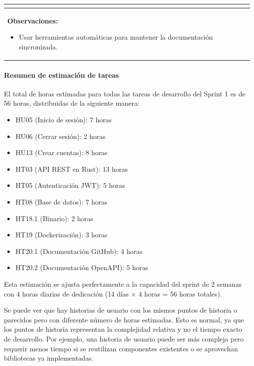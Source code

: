 \begin{table}[H]
\begin{center}
\begin{tabularx}{\textwidth}{|l|X|l|}
{\begin{itemize}
                    \end{itemize}
            }\\
            \hline
            \multicolumn{3}{|p{\textwidth}|}{
                \textbf{Observaciones:}
                \begin{itemize}
                    \item Usar herramientas automáticas para mantener la documentación sincronizada.
                \end{itemize}
            }\\
            \hline
        \end{tabularx}
    \end{center}
\end{table}

\paragraph{Resumen de estimación de tareas}

El total de horas estimadas para todas las tareas de desarrollo del Sprint 1 es de 56 horas, distribuidas de la siguiente manera:

\begin{itemize}
    \item HU05 (Inicio de sesión): 7 horas
    \item HU06 (Cerrar sesión): 2 horas  
    \item HU13 (Crear cuentas): 8 horas
    \item HT03 (API REST en Rust): 13 horas
    \item HT05 (Autenticación JWT): 5 horas
    \item HT08 (Base de datos): 7 horas
    \item HT18.1 (Binario): 2 horas
    \item HT19 (Dockerización): 3 horas
    \item HT20.1 (Documentación GitHub): 4 horas
    \item HT20.2 (Documentación OpenAPI): 5 horas
\end{itemize}

Esta estimación se ajusta perfectamente a la capacidad del sprint de 2 semanas con 4 horas diarias de dedicación (14 días × 4 horas = 56 horas totales).

Se puede ver que hay historias de usuario con los mismos puntos de historia o parecidos pero con diferente número de horas estimadas. Esto es normal, ya que los puntos de historia representan la complejidad relativa y no el tiempo exacto de desarrollo. Por ejemplo, una historia de usuario puede ser más compleja pero requerir menos tiempo si se reutilizan componentes existentes o se aprovechan bibliotecas ya implementadas.

